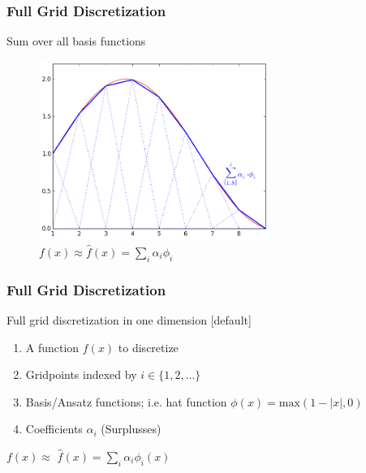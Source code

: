 \begin{frame}
  \frametitle{Full Grid Discretization}
  \topline
  \vspace{-10px}
  \begin{block}{Sum over all basis functions}
    \begin{figure}[!htp]

      \centering
      \includegraphics[width=7.5cm]{images/singlebasis_5}
      \vspace{-12px}
      \caption{$f(x) \approx \hat{f}(x) = \sum_i{\alpha_i \phi_i}$}
    \end{figure}
  \end{block}
\end{frame}

\begin{frame}
  \frametitle{Full Grid Discretization}
  \topline
  \vspace{-10px}
  \begin{block}{Full grid discretization in one dimension}
    [default]
    \begin{enumerate}
    \item A function $f(x)$ to discretize
    \item Gridpoints indexed by $i \in \{1,2,\dots\}$
    \item Basis/Ansatz functions; i.e. hat function $\phi(x)=\text{max}(1 - |x|, 0)$
    \item Coefficients $\alpha_i$ (Surplusses)
    \end{enumerate}
    \vspace{10px}
    \begin{center}
      $f(x) \approx$ $\hat{f}(x) = \sum_{i}^{}{\alpha_i \phi_i(x)}$
    \end{center}
  \end{block}
\end{frame}

